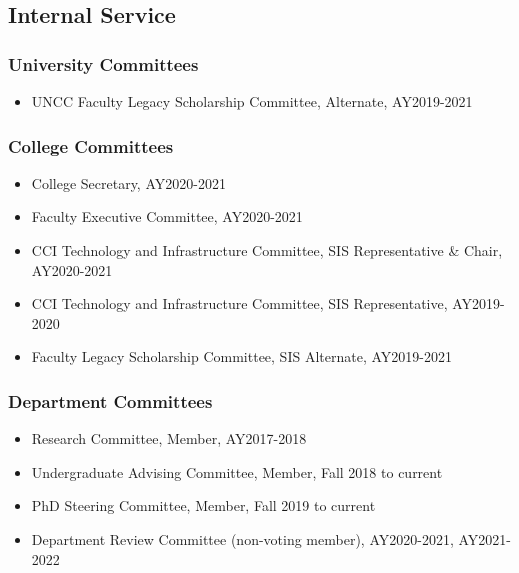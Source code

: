 
\hypertarget{internal-service}{%
\subsection{Internal Service}\label{internal-service}}

\hypertarget{university-committees}{%
\subsubsection{University Committees}\label{university-committees}}
\begin{itemize}
\item UNCC Faculty Legacy Scholarship Committee, Alternate, AY2019-2021
\end{itemize}

\hypertarget{college-committees}{%
\subsubsection{College Committees}\label{college-committees}}
\begin{itemize}
\item College Secretary, AY2020-2021
\item Faculty Executive Committee, AY2020-2021
\item CCI Technology and Infrastructure Committee, SIS Representative \& Chair, AY2020-2021
\item CCI Technology and Infrastructure Committee, SIS Representative, AY2019-2020
\item Faculty Legacy Scholarship Committee, SIS Alternate, AY2019-2021
\end{itemize}

\hypertarget{dept-committees}{%
\subsubsection{Department Committees}\label{dept-committees}}
\begin{itemize}
\item Research Committee, Member, AY2017-2018
\item Undergraduate Advising Committee, Member, Fall 2018 to current
\item PhD Steering Committee, Member, Fall 2019 to current
\item Department Review Committee (non-voting member), AY2020-2021, AY2021-2022
\end{itemize}

